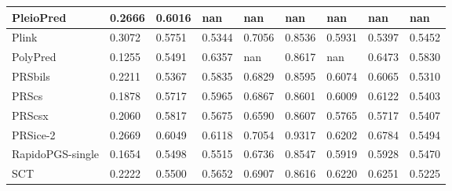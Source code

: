\documentclass[pdflatex,sn-basic]{sn-jnl}
\begin{document}
\begin{table}[!ht]
{\begin{tabular}{|l|l|l|l|l|l|l|l|l|}
\hline
PleioPred \cite{Weissbrod_2022} & \cellcolor[HTML]{C0D981}0.2666 & \cellcolor[HTML]{BAD881}0.6016 & nan & nan & nan & nan & nan & nan \\
\hline
Plink \cite{Purcell_2007} & \cellcolor[HTML]{94CD7E}0.3072 & \cellcolor[HTML]{FEE582}0.5751 & \cellcolor[HTML]{FA9A74}0.5344 & \cellcolor[HTML]{FEE783}0.7056 & \cellcolor[HTML]{FEE883}0.8536 & \cellcolor[HTML]{FED980}0.5931 & \cellcolor[HTML]{F8746D}0.5397 & \cellcolor[HTML]{FDEB84}0.5452 \\
\hline
PolyPred \cite{Hu_2017} & \cellcolor[HTML]{FCBA7A}0.1255 & \cellcolor[HTML]{FCC37C}0.5491 & \cellcolor[HTML]{98CE7F}0.6357 & nan & \cellcolor[HTML]{FCEA84}0.8617 & nan & \cellcolor[HTML]{A5D17F}0.6473 & \cellcolor[HTML]{B8D780}0.5830 \\
\hline
PRSbils & \cellcolor[HTML]{F0E784}0.2211 & \cellcolor[HTML]{FCB379}0.5367 & \cellcolor[HTML]{FAEA84}0.5835 & \cellcolor[HTML]{FCBF7B}0.6829 & \cellcolor[HTML]{FEEA83}0.8595 & \cellcolor[HTML]{F1E784}0.6074 & \cellcolor[HTML]{FAEA84}0.6065 & \cellcolor[HTML]{FA9E75}0.5310 \\
\hline
PRScs \cite{Ge_2019} & \cellcolor[HTML]{FEDF81}0.1878 & \cellcolor[HTML]{FEE182}0.5717 & \cellcolor[HTML]{E1E383}0.5965 & \cellcolor[HTML]{FDC67C}0.6867 & \cellcolor[HTML]{FFEB84}0.8601 & \cellcolor[HTML]{FFEB84}0.6009 & \cellcolor[HTML]{EEE683}0.6122 & \cellcolor[HTML]{FDD57F}0.5403 \\
\hline
PRScsx \cite{Ruan_2022} & \cellcolor[HTML]{FEEA83}0.2060 & \cellcolor[HTML]{F8E984}0.5817 & \cellcolor[HTML]{FDD47F}0.5675 & \cellcolor[HTML]{FA9573}0.6590 & \cellcolor[HTML]{FEEB84}0.8607 & \cellcolor[HTML]{FCB479}0.5765 & \cellcolor[HTML]{FBAF78}0.5717 & \cellcolor[HTML]{FDD780}0.5407 \\
\hline
PRSice-2 \cite{Choi_2019} & \cellcolor[HTML]{BFD981}0.2669 & \cellcolor[HTML]{B0D580}0.6049 & \cellcolor[HTML]{C5DB81}0.6118 & \cellcolor[HTML]{FEE783}0.7054 & \cellcolor[HTML]{63BE7B}0.9317 & \cellcolor[HTML]{D5DF82}0.6202 & \cellcolor[HTML]{63BE7B}0.6784 & \cellcolor[HTML]{F6E984}0.5494 \\
\hline
RapidoPGS-single \cite{Reales_2021} & \cellcolor[HTML]{FDD27F}0.1654 & \cellcolor[HTML]{FCC47C}0.5498 & \cellcolor[HTML]{FCB87A}0.5515 & \cellcolor[HTML]{FBAF78}0.6736 & \cellcolor[HTML]{FEE983}0.8547 & \cellcolor[HTML]{FDD780}0.5919 & \cellcolor[HTML]{FDD680}0.5928 & \cellcolor[HTML]{FAEA84}0.5470 \\
\hline
SCT \cite{Priv__2019} & \cellcolor[HTML]{EFE784}0.2222 & \cellcolor[HTML]{FCC47C}0.5500 & \cellcolor[HTML]{FDD07E}0.5652 & \cellcolor[HTML]{FDCD7E}0.6907 & \cellcolor[HTML]{FCEB84}0.8616 & \cellcolor[HTML]{D1DE82}0.6220 & \cellcolor[HTML]{D3DF82}0.6251 & \cellcolor[HTML]{F86C6B}0.5225 \\

\end{tabular}}
\end{table}
\end{document}
